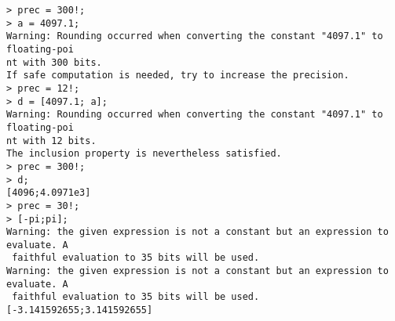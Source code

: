 \begin{center}\begin{minipage}{15cm}\begin{Verbatim}[frame=single]
> prec = 300!;
> a = 4097.1;
Warning: Rounding occurred when converting the constant "4097.1" to floating-poi
nt with 300 bits.
If safe computation is needed, try to increase the precision.
> prec = 12!;
> d = [4097.1; a];
Warning: Rounding occurred when converting the constant "4097.1" to floating-poi
nt with 12 bits.
The inclusion property is nevertheless satisfied.
> prec = 300!;
> d;
[4096;4.0971e3]
> prec = 30!;
> [-pi;pi];
Warning: the given expression is not a constant but an expression to evaluate. A
 faithful evaluation to 35 bits will be used.
Warning: the given expression is not a constant but an expression to evaluate. A
 faithful evaluation to 35 bits will be used.
[-3.141592655;3.141592655]
\end{Verbatim}
\end{minipage}\end{center}
